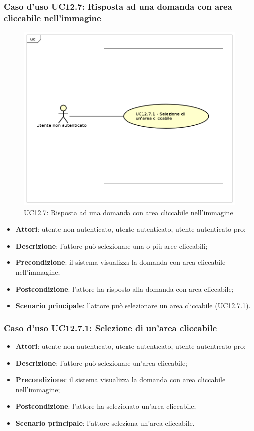 \subsubsection{Caso d'uso UC12.7: Risposta ad una domanda con area cliccabile nell'immagine}
\label{UC12.7}
\begin{figure}[h]
	\centering
	\includegraphics[scale=0.5]{UML/UC12_7.png}
	\caption{UC12.7: Risposta ad una domanda con area cliccabile nell'immagine}
\end{figure}
\begin{itemize}
\item \textbf{Attori}: utente non autenticato, utente autenticato, utente autenticato pro;
\item \textbf{Descrizione}: l'attore può selezionare una o più aree cliccabili;
\item \textbf{Precondizione}: il sistema visualizza la domanda con area cliccabile nell'immagine;
\item \textbf{Postcondizione}: l'attore ha risposto alla domanda con area cliccabile;
\item \textbf{Scenario principale}: l'attore può selezionare un area cliccabile (UC12.7.1).
\end{itemize}

\subsubsection{Caso d'uso UC12.7.1: Selezione di un'area cliccabile}
\begin{itemize}
\item \textbf{Attori}: utente non autenticato, utente autenticato, utente autenticato pro;
\item \textbf{Descrizione}: l'attore può selezionare un'area cliccabile;
\item \textbf{Precondizione}: il sistema visualizza la domanda con area cliccabile nell'immagine;
\item \textbf{Postcondizione}: l'attore ha selezionato un'area cliccabile;
\item \textbf{Scenario principale}: l'attore seleziona un'area cliccabile.
\end{itemize}